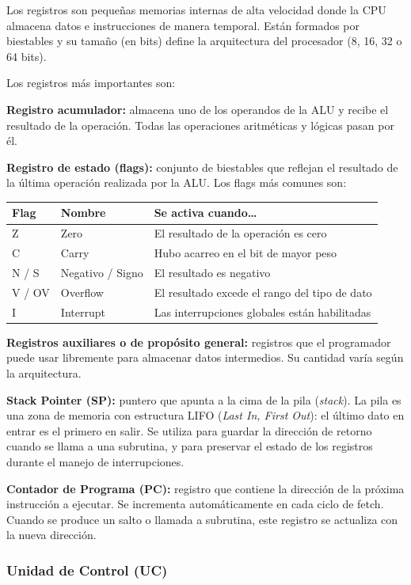 Los registros son pequeñas memorias internas de alta velocidad donde la CPU almacena datos e instrucciones de manera temporal. Están formados por biestables y su tamaño (en bits) define la arquitectura del procesador (8, 16, 32 o 64 bits).

Los registros más importantes son:

\textbf{Registro acumulador:} almacena uno de los operandos de la ALU y recibe el resultado de la operación. Todas las operaciones aritméticas y lógicas pasan por él.

\textbf{Registro de estado (flags):} conjunto de biestables que reflejan el resultado de la última operación realizada por la ALU. Los flags más comunes son:

\begin{table}[H]
\centering
\begin{tabular}{lll}
\toprule
Flag & Nombre & Se activa cuando\ldots \\
\midrule
Z & Zero & El resultado de la operación es cero \\
C & Carry & Hubo acarreo en el bit de mayor peso \\
N / S & Negativo / Signo & El resultado es negativo \\
V / OV & Overflow & El resultado excede el rango del tipo de dato \\
I & Interrupt & Las interrupciones globales están habilitadas \\
\bottomrule
\end{tabular}
\end{table}

\textbf{Registros auxiliares o de propósito general:} registros que el programador puede usar libremente para almacenar datos intermedios. Su cantidad varía según la arquitectura.

\textbf{Stack Pointer (SP):} puntero que apunta a la cima de la pila (\textit{stack}). La pila es una zona de memoria con estructura LIFO (\textit{Last In, First Out}): el último dato en entrar es el primero en salir. Se utiliza para guardar la dirección de retorno cuando se llama a una subrutina, y para preservar el estado de los registros durante el manejo de interrupciones.

\textbf{Contador de Programa (PC):} registro que contiene la dirección de la próxima instrucción a ejecutar. Se incrementa automáticamente en cada ciclo de fetch. Cuando se produce un salto o llamada a subrutina, este registro se actualiza con la nueva dirección.

\subsubsection{Unidad de Control (UC)}

